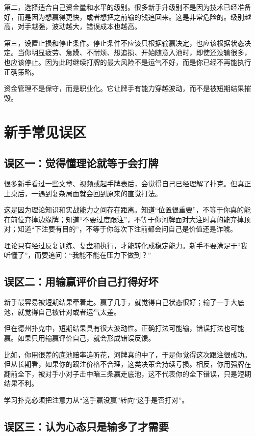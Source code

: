 第二，选择适合自己资金量和水平的级别。很多新手升级别不是因为技术已经准备好，而是因为想赢得更快，或者想把之前输的钱追回来。这是非常危险的。级别越高，对手越强，波动越大，错误成本也越高。

第三，设置止损和停止条件。停止条件不应该只根据输赢决定，也应该根据状态决定。当你明显疲劳、急躁、不耐烦、想追损、开始随意入池时，即使还没输很多，也应该停止。因为此时继续打牌的最大风险不是运气不好，而是你已经不再能执行正确策略。

资金管理不是保守，而是职业化。它让牌手有能力穿越波动，而不是被短期结果摧毁。

\section{新手常见误区}

\subsection{误区一：觉得懂理论就等于会打牌}

很多新手看过一些文章、视频或起手牌表后，会觉得自己已经理解了扑克。但真正上桌后，一遇到复杂局面就会回到原来的直觉打法。

这是因为理论知识和实战能力之间存在距离。知道“位置很重要”，不等于你真的能在前位弃掉边缘牌；知道“不要过度跟注”，不等于你河牌面对大注时真的能弃掉顶对；知道“下注要有目的”，不等于你每次下注前都会问自己是价值还是诈唬。

理论只有经过反复训练、复盘和执行，才能转化成稳定能力。新手不要满足于“我听懂了”，而要追问：“我能不能在压力下做到？”

\subsection{误区二：用输赢评价自己打得好坏}

新手最容易被短期结果牵着走。赢了几手，就觉得自己状态很好；输了一手大底池，就觉得自己被针对或者运气太差。

但在德州扑克中，短期结果具有很大波动性。正确打法可能输，错误打法也可能赢。如果只用输赢评价自己，就会形成错误反馈。

比如，你用很差的底池赔率追听花，河牌真的中了，于是你觉得这次跟注很成功。但从长期看，如果你的跟注价格不合理，这类决策会持续亏损。相反，你用强牌在翻前全下，被对手小对子击中暗三条赢走底池，这不代表你的全下错误，只是短期结果不利。

学习扑克必须把注意力从“这手赢没赢”转向“这手是否打对”。

\subsection{误区三：认为心态只是输多了才需要}

